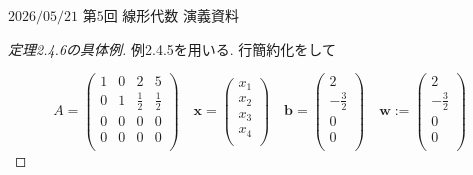 \documentclass[dvipdfmx,a4paper,11pt]{article} %
\theoremstyle{definition}
\begin{document}
 \newpage
$\boxed{\text{2026/05/21 第5回 線形代数 演義資料}}$
\begin{proof}[定理2.4.6の具体例]
例2.4.5を用いる. 行簡約化をして

$$
A=
\begin{pmatrix}
 1&  0&  2 &  5\\
 0&  1&  \frac{1}{2}& \frac{1}{2}\\
0&  0 &  0& 0\\
0&  0 &  0& 0\\
 \end{pmatrix}
 \quad
 \mathbf{x}
 =
 \begin{pmatrix}
x_1 \\
x_2 \\
x_3 \\
x_4 \\
 \end{pmatrix}
 \quad
 \mathbf{b}
 =
 \begin{pmatrix}
2 \\
-\frac{3}{2} \\
0 \\
0 \\
 \end{pmatrix}
 \quad 
 \mathbf{w}
:=
 \begin{pmatrix}
2 \\
-\frac{3}{2} \\
0 \\
0 \\

\end{pmatrix}$$
\end{proof}
\end{document}
